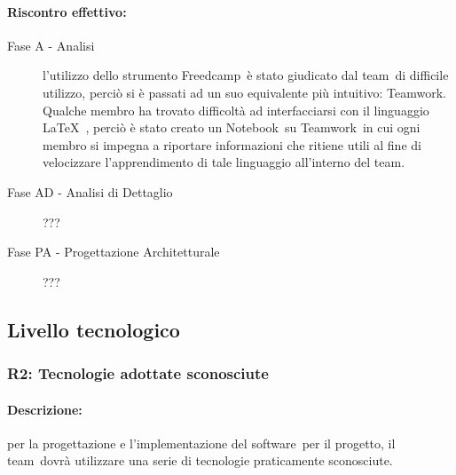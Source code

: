 \documentclass[../PianoProgetto.tex]{subfiles}
\begin{document}
	\newpage
	\paragraph*{Riscontro effettivo:} 
		\begin{description}
			\item[Fase A - Analisi] l'utilizzo dello strumento Freedcamp\g\ è stato giudicato dal team\g\ di difficile utilizzo, perciò si è passati ad un suo equivalente più intuitivo: Teamwork\g .
	Qualche membro ha trovato difficoltà ad interfacciarsi con il linguaggio \LaTeX\  , perciò è stato creato un Notebook\g\ su Teamwork\g\ in cui ogni membro si impegna a riportare informazioni che ritiene utili al fine di velocizzare l'apprendimento di tale linguaggio all'interno del team\g .
			\item[Fase AD - Analisi di Dettaglio] ???
			\item[Fase PA - Progettazione Architetturale] ???
		\end{description}
		
\subsection{Livello tecnologico}

\subsubsection{R2: Tecnologie adottate sconosciute}

	\paragraph*{Descrizione:} per la progettazione e l'implementazione del software\g\ per il progetto, il team\g\ dovrà utilizzare una serie di tecnologie praticamente sconosciute.
	
\end{document}
